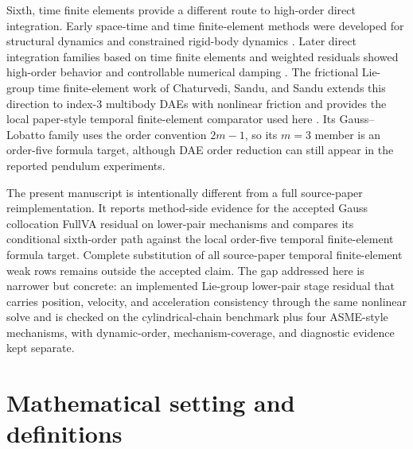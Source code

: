 \documentclass[preprint,12pt]{elsarticle}
\begin{document}
Sixth, time finite elements provide a different route to high-order direct
integration. Early space-time and time finite-element methods were developed
for structural dynamics and constrained rigid-body dynamics
\cite{borri1988rigid,hughes1988spacetime,hulbert1992time}. Later direct
integration families based on time finite elements and weighted residuals
showed high-order behavior and controllable numerical damping
\cite{kim2017higher,jog2016robust,bauchau2024time}. The frictional
Lie-group time finite-element work of Chaturvedi, Sandu, and Sandu extends
this direction to index-3 multibody DAEs with nonlinear friction and provides
the local paper-style temporal finite-element comparator used here
\cite{chaturvedi2026tfe}. Its Gauss--Lobatto family uses the order convention
$2m-1$, so its $m=3$ member is an order-five formula target, although DAE
order reduction can still appear in the reported pendulum experiments.

The present manuscript is intentionally different from a full source-paper
reimplementation. It reports method-side evidence for the accepted Gauss
collocation FullVA residual on lower-pair mechanisms and compares its
conditional sixth-order path against the local order-five temporal
finite-element formula target. Complete
substitution of all source-paper temporal finite-element weak rows remains
outside the accepted claim. The gap addressed here is narrower but concrete:
an implemented Lie-group lower-pair stage residual that carries position,
velocity, and acceleration consistency through the same nonlinear solve and is
checked on the cylindrical-chain benchmark plus four ASME-style mechanisms,
with dynamic-order, mechanism-coverage, and diagnostic evidence kept separate.

\section{Mathematical setting and definitions}
\end{document}
